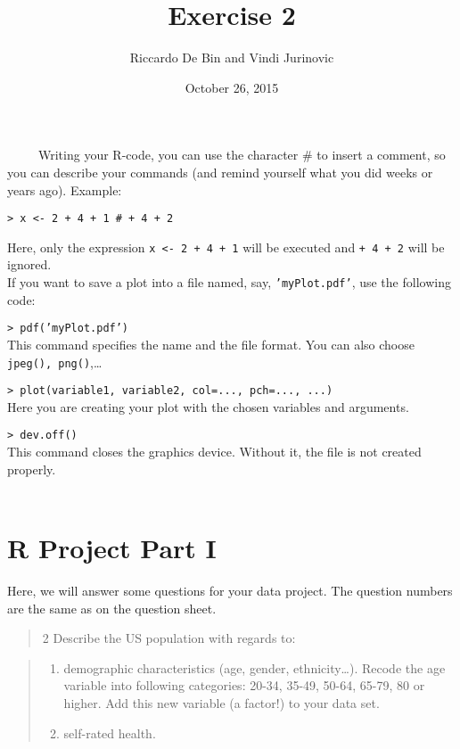 \documentclass[]{article}
\title{Exercise 2}
\author{Riccardo De Bin and Vindi Jurinovic}
\date{October 26, 2015}
\begin{document}
\maketitle


~~~~~Writing your R-code, you can use the character \# to insert a
comment, so you can describe your commands (and remind yourself what you
did weeks or years ago). Example:

\begin{verbatim}
> x <- 2 + 4 + 1 # + 4 + 2
\end{verbatim}

Here, only the expression \texttt{x \textless{}- 2 + 4 + 1} will be
executed and \texttt{+ 4 + 2} will be ignored.\\

If you want to save a plot into a file named, say,
\texttt{'myPlot.pdf'}, use the following code:

\texttt{\textgreater{} pdf('myPlot.pdf')}\\This command specifies the
name and the file format. You can also choose
\texttt{jpeg(), png()},\ldots{}

\texttt{\textgreater{} plot(variable1, variable2, col=..., pch=..., ...)}\\Here
you are creating your plot with the chosen variables and arguments.

\texttt{\textgreater{} dev.off()}\\This command closes the graphics
device. Without it, the file is not created properly.\\\\

\section{R Project Part I}\label{r-project-part-i}

Here, we will answer some questions for your data project. The question
numbers are the same as on the question sheet.

\begin{quote}
2 Describe the US population with regards to:
\end{quote}

\begin{quote}
\begin{enumerate}
\def\labelenumi{\alph{enumi})}
\itemsep1pt\parskip0pt
\item
  demographic characteristics (age, gender, ethnicity\ldots{}). Recode
  the age variable into following categories: 20-34, 35-49, 50-64,
  65-79, 80 or higher. Add this new variable (a factor!) to your data
  set.
\item
  self-rated health.
\end{enumerate}
\end{quote}
\end{document}
